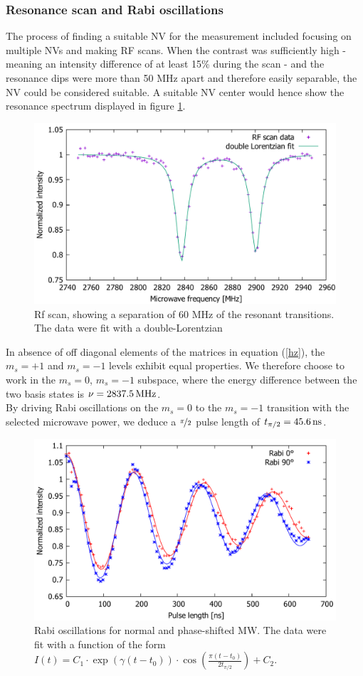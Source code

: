 \documentclass[12pt,a4paper]{article}
\begin{document}
\subsubsection{Resonance scan and Rabi oscillations}
The process of finding a suitable NV for the measurement included focusing on multiple NVs and making RF scans. When the contrast was sufficiently high - meaning an intensity difference of at least 15\% during the scan - and the resonance dips were more than 50 MHz apart and therefore easily separable, the NV could be considered suitable. A suitable NV center would hence show the resonance spectrum displayed in figure \ref{rf2}.
\begin{figure}[H]
\includegraphics[scale=0.6]{rf2fit.pdf} 
\caption{Rf scan, showing a separation of 60 MHz of the resonant transitions. The data were fit with a double-Lorentzian}
\label{rf2}
\end{figure}
In absence of off diagonal elements of the matrices in equation (\ref{hz}), the $m_s=+1$ and $m_s=-1$ levels exhibit equal properties. We therefore choose to work in the $m_s=0$, $m_s=-1$ subspace, where the energy difference between the two basis states is $\nu=\unit[2837.5]{MHz}$.
\\
By driving Rabi oscillations on the $m_s=0$ to the $m_s=-1$ transition with the selected microwave power, we deduce a $\nicefrac{\pi}{2}$ pulse length of $t_{\pi/2}=\unit[45.6]{ns}$. \\
\begin{figure}[H]
\includegraphics[scale=0.6]{rabinano.pdf} 
\caption{Rabi oscillations for normal and phase-shifted MW. The data were fit with a function of the form $I(t)=C_1\cdot\exp(\gamma(t-t_0))\cdot\cos\left(\frac{\pi(t-t_0)}{2t_{\pi/2}}\right)+C_2$.}
\label{rabn1}
\end{figure}
\end{document}
